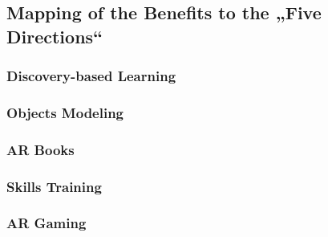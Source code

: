 \subsection{Mapping of the Benefits to the „Five Directions“}
\subsubsection{Discovery-based Learning}
\subsubsection{Objects Modeling}
\subsubsection{AR Books}
\subsubsection{Skills Training}
\subsubsection{AR Gaming}

